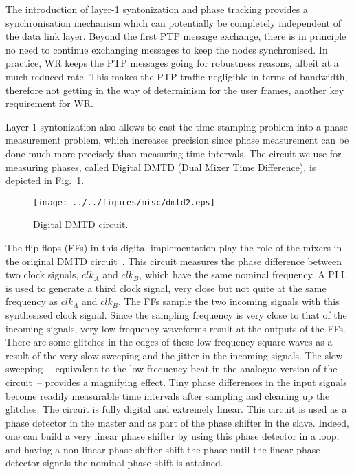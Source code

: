 \documentclass{../JAC2003}
\begin{document}
The introduction of layer-1 syntonization and phase tracking provides
a synchronisation mechanism which can potentially be completely
independent of the data link layer. Beyond the first PTP message
exchange, there is in principle no need to continue exchanging
messages to keep the nodes synchronised. In practice, WR keeps the PTP
messages going for robustness reasons, albeit at a much reduced
rate. This makes the PTP traffic negligible in terms of bandwidth,
therefore not getting in the way of determinism for the user frames,
another key requirement for WR. 

Layer-1 syntonization also allows to cast the time-stamping problem
into a phase measurement problem, which increases precision since
phase measurement can be done much more precisely than measuring time
intervals. The circuit we use for measuring phases, called Digital
DMTD (Dual Mixer Time Difference), is depicted in
Fig.~\ref{ddmtd-fig}.

\begin{figure}[htb]
   \centering
   \texttt{[image: ../../figures/misc/dmtd2.eps]}
   \caption{Digital DMTD circuit.}
   \label{ddmtd-fig}
\end{figure}

The flip-flops (FFs) in this digital implementation play the role of
the mixers in the original DMTD circuit~\cite{dmtd-ref}. This circuit
measures the phase difference between two clock signals, $clk_A$ and
$clk_B$, which have the same nominal frequency. A PLL is used to
generate a third clock signal, very close but not quite at the same
frequency as $clk_A$ and $clk_B$. The FFs sample the two incoming
signals with this synthesised clock signal. Since the sampling
frequency is very close to that of the incoming signals, very low
frequency waveforms result at the outputs of the FFs. There are some
glitches in the edges of these low-frequency square waves as a result
of the very slow sweeping and the jitter in the incoming signals. The
slow sweeping --~equivalent to the low-frequency beat in the analogue
version of the circuit~-- provides a magnifying effect. Tiny phase
differences in the input signals become readily measurable time
intervals after sampling and cleaning up the glitches. The circuit is
fully digital and extremely linear. This circuit is used as a phase
detector in the master and as part of the phase shifter in the
slave. Indeed, one can build a very linear phase shifter by using this
phase detector in a loop, and having a non-linear phase shifter shift
the phase until the linear phase detector signals the nominal phase
shift is attained.
\end{document}
